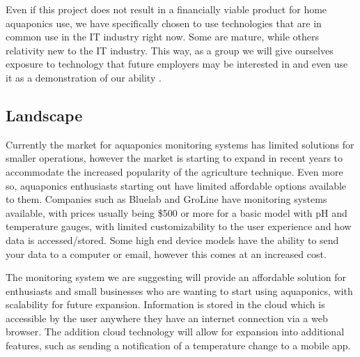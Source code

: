 \documentclass[11pt, oneside, a4paper, titlepage]{article}
\begin{document}
Even if this project does not result in a financially viable product for home aquaponics use, we have specifically chosen to use technologies that are in common use in the IT industry right now. Some are mature, while others relativity new to the IT industry.  This way, as a group we will give ourselves exposure to technology that future employers may be interested in and even use it as a demonstration of our ability .

\subsection{Landscape}
Currently the market for aquaponics monitoring systems has limited solutions for smaller operations, however the market is starting to expand in recent years to accommodate the increased popularity of the agriculture technique. Even more so, aquaponics enthusiasts starting out have limited affordable options available to them. Companies such as Bluelab and GroLine have monitoring systems available, with prices usually being \$500 or more for a basic model with pH and temperature gauges, with limited customizability to the user experience and how data is accessed/stored. Some high end device models have the ability to send your data to a computer or email, however this comes at an increased cost. 

The monitoring system we are suggesting will provide an affordable solution for enthusiasts and small businesses who are wanting to start using aquaponics, with scalability for future expansion. Information is stored in the cloud which is accessible by the user anywhere they have an internet connection via a web browser. The addition cloud technology will allow for expansion into additional features, such as sending a notification of a temperature change to a mobile app. 
\end{document}
